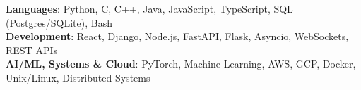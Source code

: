 \begin{itemize}[leftmargin=0.15in, label={}]
    \small{\item{
     \textbf{Languages}{: Python, C, C++, Java, JavaScript, TypeScript, SQL (Postgres/SQLite), Bash} \\
     \textbf{Development}{: React, Django, Node.js, FastAPI, Flask, Asyncio, WebSockets, REST APIs} \\
     \textbf{AI/ML, Systems \& Cloud}{: PyTorch, Machine Learning, AWS, GCP, Docker, Unix/Linux, Distributed Systems}
    }}
\end{itemize}
